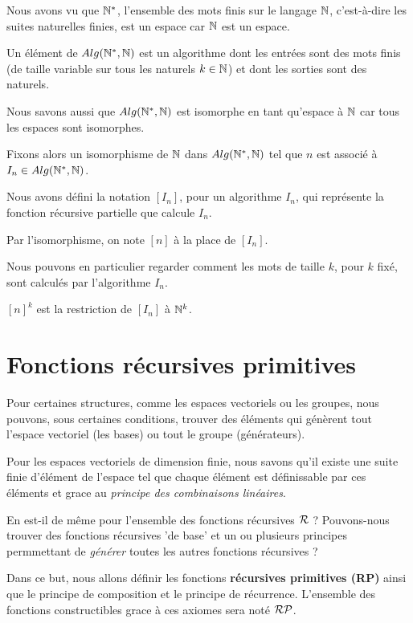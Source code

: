 Nous avons vu que $\mathbb{N}^{*}$, l'ensemble des mots finis sur le langage
$\mathbb{N}$, c'est-à-dire les suites naturelles finies, est un espace car
$\mathbb{N}$ est un espace.

Un élément de $Alg(\mathbb{N}^{*}, \mathbb{N})$ est un algorithme dont les entrées
sont des mots finis (de taille variable sur tous les naturels $k \in \mathbb{N}$)
et dont les sorties sont des naturels.

Nous savons aussi que $Alg(\mathbb{N}^{*}, \mathbb{N})$ est isomorphe en tant qu'espace
à $\mathbb{N}$ car tous les espaces sont isomorphes.

Fixons alors un isomorphisme de $\mathbb{N}$ dans $Alg(\mathbb{N}^{*},
\mathbb{N})$ tel que $n$ est associé à $I_{n} \in Alg(\mathbb{N}^{*}, \mathbb{N})$.

Nous avons défini la notation $[I_{n}]$, pour un algorithme $I_{n}$, qui
représente la fonction récursive partielle que calcule $I_{n}$.

Par l'isomorphisme, on note $[n]$ à la place de $[I_{n}]$.

Nous pouvons en particulier regarder comment les mots de taille $k$, pour $k$
fixé, sont calculés par l'algorithme $I_{n}$.

\begin{notation}
	$[n]^{k}$ est la restriction de $[I_{n}]$ à $\mathbb{N}^{k}$.
\end{notation}


\section{Fonctions récursives primitives}

Pour certaines structures, comme les espaces vectoriels ou les groupes, nous
pouvons, sous certaines conditions, trouver des éléments qui génèrent tout
l'espace vectoriel (les bases) ou tout le groupe (générateurs).

Pour les espaces vectoriels de dimension finie, nous savons qu'il existe une
suite finie d'élément de l'espace tel que chaque élément est définissable par
ces éléments et grace au \textit{principe des combinaisons linéaires}.

En est-il de même pour l'ensemble des fonctions récursives
$\mathcal{R}$ ? Pouvons-nous trouver des fonctions récursives 'de
base' et un ou plusieurs principes permmettant de \textit{générer} toutes les
autres fonctions récursives ?

Dans ce but, nous allons définir les fonctions \textbf{récursives primitives
(RP)} ainsi que le principe de composition et le principe de récurrence.
L'ensemble des fonctions constructibles grace à ces axiomes sera noté
$\mathcal{RP}$.

